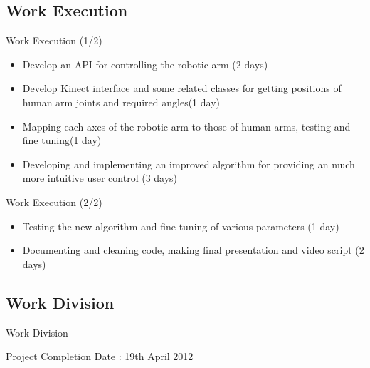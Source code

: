 \documentclass{beamer}
\begin{document}
\subsection{Work Execution}
\begin{frame}{Work Execution (1/2)}
\begin{itemize}
\item Develop an API for controlling the robotic arm (2 days)
\item Develop Kinect interface and some related classes for getting positions of human arm joints and required angles(1 day)
\item Mapping each axes of the robotic arm to those of human arms, testing and fine tuning(1 day)
\item Developing and implementing an improved algorithm for providing an much more intuitive user control (3 days)
\end{itemize}
\end{frame}

\begin{frame}{Work Execution (2/2)}
\begin{itemize}
\item Testing the new algorithm and fine tuning of various parameters (1 day)
\item Documenting and cleaning code, making final presentation and video script (2 days)
\end{itemize}
\end{frame}

\subsection{Work Division}
\begin{frame}{Work Division}
\begin{table}[h]
\setlength{\tabcolsep}{10pt}
\noindent{}
\end{table}
Project Completion Date : 19th April 2012
\end{frame}
\end{document}
